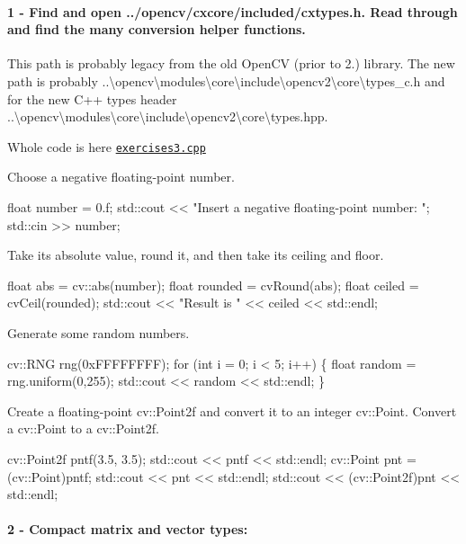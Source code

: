 \paragraph*{1 -\/ Find and open {\ttfamily ../opencv/cxcore/included/cxtypes.h}. Read through and find the many conversion helper functions.}

This path is probably legacy from the old Open\+CV (prior to 2.) library. The new path is probably {\ttfamily ..\textbackslash{}opencv\textbackslash{}modules\textbackslash{}core\textbackslash{}include\textbackslash{}opencv2\textbackslash{}core\textbackslash{}types\+\_\+c.\+h} and for the new C++ types header {\ttfamily ..\textbackslash{}opencv\textbackslash{}modules\textbackslash{}core\textbackslash{}include\textbackslash{}opencv2\textbackslash{}core\textbackslash{}types.\+hpp}.

Whole code is here \href{https://github.com/CodefroesPuc/learningOpencv3/blob/master/Cap3/exercises3.cpp}{\tt exercises3.\+cpp}
\begin{DoxyEnumerate}
\item Choose a negative floating-\/point number. 
\begin{DoxyCodeInclude}
    \textcolor{keywordtype}{float} number = 0.f; 
    std::cout << \textcolor{stringliteral}{"Insert a negative floating-point number: "};
    std::cin >> number;
\end{DoxyCodeInclude}

\item Take its absolute value, round it, and then take its ceiling and floor. 
\begin{DoxyCodeInclude}
    \textcolor{keywordtype}{float} abs = cv::abs(number);
    \textcolor{keywordtype}{float} rounded = cvRound(abs);
    \textcolor{keywordtype}{float} ceiled = cvCeil(rounded);
    std::cout << \textcolor{stringliteral}{"Result is "} << ceiled << std::endl;
\end{DoxyCodeInclude}

\item Generate some random numbers. 
\begin{DoxyCodeInclude}
    cv::RNG rng(0xFFFFFFFF);
    \textcolor{keywordflow}{for} (\textcolor{keywordtype}{int} i = 0; i < 5; i++)
    \{
        \textcolor{keywordtype}{float} random = rng.uniform(0,255);
        std::cout << random << std::endl;
    \}
\end{DoxyCodeInclude}

\item Create a floating-\/point {\ttfamily cv\+::\+Point2f} and convert it to an integer {\ttfamily cv\+::\+Point}. Convert a {\ttfamily cv\+::\+Point} to a {\ttfamily cv\+::\+Point2f}. 
\begin{DoxyCodeInclude}
    cv::Point2f pntf(3.5, 3.5);
    std::cout << pntf << std::endl;
    cv::Point pnt = (cv::Point)pntf;
    std::cout << pnt << std::endl;
    std::cout << (cv::Point2f)pnt << std::endl;
\end{DoxyCodeInclude}
 \paragraph*{2 -\/ Compact matrix and vector types\+:}
\end{DoxyEnumerate}

